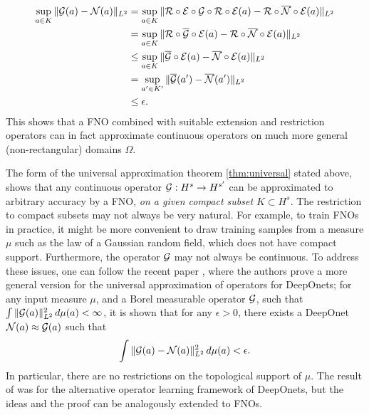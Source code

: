 \documentclass[reqno,a4paper]{amsart}
\begin{document}
\begin{remark}
\begin{align*}
\sup_{a\in K} \Vert {\mathcal{G}}(a) - {\mathcal{N}}(a) \Vert_{L^2} 
&=
\sup_{a\in K} \Vert \mathcal{R} \circ \mathcal{E}\circ {\mathcal{G}} \circ \mathcal{R} \circ \mathcal{E}(a) - \mathcal{R} \circ \overline{\mathcal{N}} \circ \mathcal{E}(a) \Vert_{L^2} 
\\
&=
\sup_{a\in K} \Vert \mathcal{R} \circ \overline{\mathcal{G}} \circ \mathcal{E}(a) - \mathcal{R} \circ \overline{\mathcal{N}} \circ \mathcal{E}(a) \Vert_{L^2} 
\\
&\le
\sup_{a\in K} \Vert \overline{\mathcal{G}} \circ \mathcal{E}(a) - \overline{\mathcal{N}} \circ \mathcal{E}(a) \Vert_{L^2}
\\
&=
\sup_{a'\in K'} \Vert \overline{\mathcal{G}}(a') - \overline{\mathcal{N}}(a') \Vert_{L^2}
\\
&\le \epsilon.
\end{align*}
This shows that a FNO combined with suitable extension and restriction operators can in fact approximate continuous operators on much more general (non-rectangular) domains $\Omega$.
\end{remark}
\fi 

\begin{remark}
The form of the universal approximation theorem \ref{thm:universal} stated above, shows that any continuous operator $\mathcal{G}: H^s \to H^{s'}$ can be approximated to arbitrary accuracy by a FNO, \emph{on a given compact subset $K\subset H^s$}. The restriction to compact subsets may not always be very natural. For example, to train FNOs in practice, it might be more convenient to draw training samples from a measure $\mu$ such as the law of a Gaussian random field, which does not have compact support. Furthermore, the operator $\mathcal{G}$ may not always be continuous. To address these issues, one can follow the recent paper \cite{LMK2021}, where the authors prove a more general version for the universal approximation of operators for DeepOnets; for any input measure $\mu$, and a Borel measurable operator $\mathcal{G}$, such that $\int \Vert \mathcal{G}(a) \Vert_{L^2}^2 \, d\mu(a) < \infty$, it is shown that for any $\epsilon > 0$, there exists a DeepOnet $\mathcal{N}(a) \approx \mathcal{G}(a)$ such that 
\[
\int \Vert \mathcal{G}(a) - \mathcal{N}(a) \Vert_{L^2}^2 \, d\mu(a) < \epsilon.
\]
In particular, there are no restrictions on the topological support of $\mu$. The result of \cite{LMK2021} was for the alternative operator learning framework of DeepOnets, but the ideas and the proof can be analogously extended to FNOs. 
\end{remark}
\end{document}
